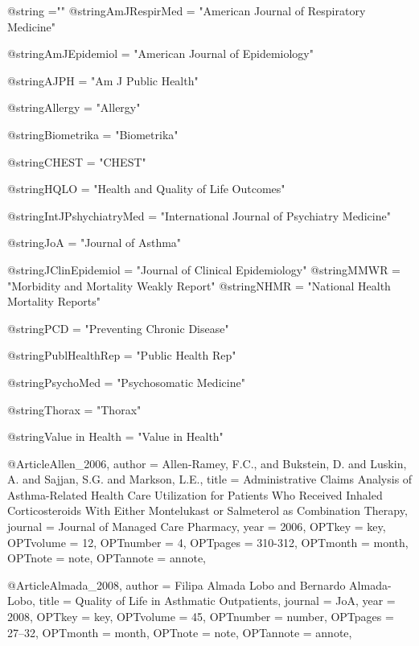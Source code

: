 @string{ ="" }
@string{AmJRespirMed = "American Journal of Respiratory Medicine"}

@string{AmJEpidemiol = "American Journal of Epidemiology"}

@string{AJPH = "Am J Public Health"}

@string{Allergy = "Allergy"}

@string{Biometrika = "Biometrika"}

@string{CHEST = "CHEST"}





@string{HQLO = "Health and Quality of Life Outcomes"}


@string{IntJPshychiatryMed = "International Journal of Psychiatry Medicine"}

@string{JoA = "Journal of Asthma"}

@string{JClinEpidemiol = "Journal of Clinical Epidemiology"}
@string{MMWR = "Morbidity and Mortality Weakly Report"}
@string{NHMR = "National Health Mortality Reports"}

@string{PCD = "Preventing Chronic Disease"}

@string{PublHealthRep = "Public Health Rep"}

@string{PsychoMed = "Psychosomatic Medicine"}

@string{Thorax = "Thorax"}

@string{Value in Health = "Value in Health"}



@Article{Allen_2006,
author = {Allen-Ramey, F.C., and Bukstein, D. and Luskin, A. and Sajjan, S.G. and Markson, L.E.},
title = {Administrative Claims Analysis of Asthma-Related Health Care Utilization for Patients Who Received Inhaled Corticosteroids With Either Montelukast or Salmeterol as Combination Therapy},
journal = {Journal of Managed Care Pharmacy},
year = {2006},
OPTkey = {key},
OPTvolume = {12},
OPTnumber = {4},
OPTpages = {310-312},
OPTmonth = {month},
OPTnote = {note},
OPTannote = {annote},
}

@Article{Almada_2008,
author = {Filipa Almada Lobo and Bernardo Almada-Lobo},
title = {Quality of Life in Asthmatic Outpatients},
journal = {JoA},
year = {2008},
OPTkey = {key},
OPTvolume = {45},
OPTnumber = {number},
OPTpages = {27–32},
OPTmonth = {month},
OPTnote = {note},
OPTannote = {annote},
}

